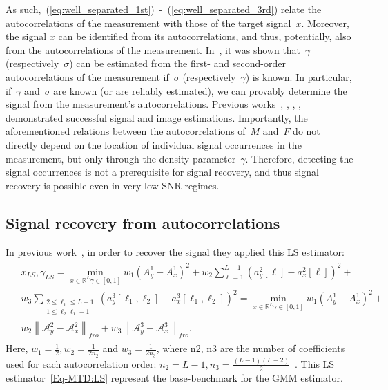 \documentclass{article}
\newcommand{\asafc}[1]{{\color{blue}{[Asaf: #1]}}}
\newcommand{\A}[0]{\mathcal{A}}
\newcommand{\R}[0]{\mathbb{R}}
\begin{document}
\asafc{I'm not sure that this is relevant. We should only mention that 3 auto' are enough in order to recover $x$ and $\gamma$}As such,~\mbox{(\ref{eq:well_separated_1st}) -~(\ref{eq:well_separated_3rd})} relate the autocorrelations of the measurement with those of the target signal~$x$. Moreover, the signal $x$ can be identified from its autocorrelations, and thus, potentially, also from the autocorrelations of the measurement. In~\cite{bendory2019multi}, it was shown that~$\gamma$ (respectively~$\sigma$) can be estimated from the first- and second-order autocorrelations of the measurement if~$\sigma$ (respectively~$\gamma$) is known. In particular, if~$\gamma$ and~$\sigma$ are known (or are reliably estimated), we can provably determine the signal from the measurement's autocorrelations. Previous works~\cite{bendory2019multi}, \cite{lan2020multi}, \cite{marshall2020image}, \cite{bendory2021multi}, \cite{kreymer2021two} demonstrated successful signal and image estimations. Importantly, the aforementioned relations between the autocorrelations of~$M$ and~$F$ do not directly depend on the location of individual signal occurrences in the measurement, but only through the density parameter~$\gamma$. Therefore, detecting the signal occurrences is not a prerequisite for signal recovery, and thus signal recovery is possible even in very low SNR regimes.

\subsection{Signal recovery from autocorrelations}
In previous work~\cite{bendory2019multi}, in order to recover the signal they applied this LS estimator:
\begin{align} \label{Eq-MTD:LS}
	\begin{split}
	&x_{LS}, \gamma_{LS} = \min_{
			\scriptscriptstyle{x\in\R^L \gamma \in [0,1]}}
		 w_1 (A_y^1 - A_x^1)^2 + w_2 \sum_{\ell=1}^{L-1} (a_y^2[\ell] - a_x^2[\ell])^2 + \\
	& w_3 \sum_{\begin{gathered}
			\scriptscriptstyle{2 \le \ell_1 \le L-1} \\
			\scriptscriptstyle{1 \le \ell_2 \ell_1-1}
		\end{gathered}}  (a_y^3[\ell_1,\ell_2] - a_x^3[\ell_1,\ell_2])^2 = \min_{
	\scriptscriptstyle{x\in\R^L \gamma \in [0,1]}} w_1 (A_y^1 - A_x^1)^2 + \\
		&w_2 \left\|\A_y^2 - \A_x^2 \right\|_{fro} + w_3 \left\|\A_y^3 - \A_x^3 \right\|_{fro}. 
	\end{split}
\end{align}
Here, $w_1 = \frac{1}{2}, w_2 = \frac{1}{2n_2}$ and $w_3 = \frac{1}{2n_3}$, where n2, n3 are the number of coefficients used for each
autocorrelation order: $n_2 = L-1, n_3 = \frac{(L-1)(L-2)}{2}$~\cite{8362313}.
This LS estimator~\eqref{Eq-MTD:LS} represent the base-benchmark for the GMM estimator.
\end{document}
